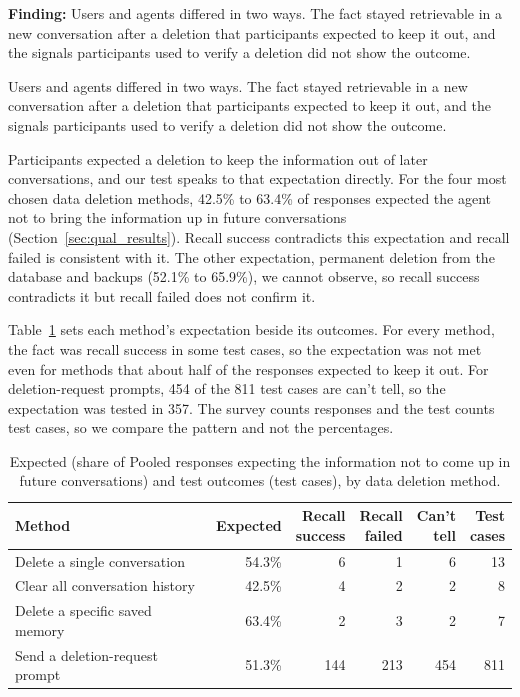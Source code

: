     \begin{takeawaybox}
    \textbf{Finding:} Users and agents differed in two ways. The fact stayed retrievable in a new conversation after a deletion that participants expected to keep it out, and the signals participants used to verify a deletion did not show the outcome.
    \end{takeawaybox}
    
    Users and agents differed in two ways. The fact stayed retrievable in a new conversation after a deletion that participants expected to keep it out, and the signals participants used to verify a deletion did not show the outcome.

    Participants expected a deletion to keep the information out of later conversations, and our test speaks to that expectation directly. For the four most chosen data deletion methods, 42.5\% to 63.4\% of responses expected the agent not to bring the information up in future conversations (Section~\ref{sec:qual_results}). Recall success contradicts this expectation and recall failed is consistent with it. The other expectation, permanent deletion from the database and backups (52.1\% to 65.9\%), we cannot observe, so recall success contradicts it but recall failed does not confirm it.

    Table~\ref{tab:expectation-outcome} sets each method's expectation beside its outcomes. For every method, the fact was recall success in some test cases, so the expectation was not met even for methods that about half of the responses expected to keep it out. For deletion-request prompts, 454 of the 811 test cases are can't tell, so the expectation was tested in 357. The survey counts responses and the test counts test cases, so we compare the pattern and not the percentages.

    \begin{table}[!t]
    \centering
    \caption{Expected (share of Pooled responses expecting the information not to come up in future conversations) and test outcomes (test cases), by data deletion method.}
    \label{tab:expectation-outcome}
    \footnotesize
    \setlength{\tabcolsep}{3pt}
    \begin{tabularx}{\columnwidth}{@{}Xrrrrr@{}}
    \toprule
    Method & Expected & \makecell[r]{Recall\\success} & \makecell[r]{Recall\\failed} & \makecell[r]{Can't\\tell} & \makecell[r]{Test\\cases} \\
    \midrule
    Delete a single conversation & 54.3\% & 6 & 1 & 6 & 13 \\
    Clear all conversation history & 42.5\% & 4 & 2 & 2 & 8 \\
    Delete a specific saved memory & 63.4\% & 2 & 3 & 2 & 7 \\
    Send a deletion-request prompt & 51.3\% & 144 & 213 & 454 & 811 \\
    \bottomrule
    \end{tabularx}
    \end{table}

